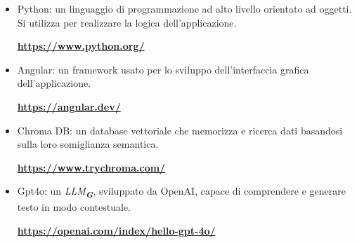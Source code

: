 \begin{itemize}
    \item Python: un linguaggio di programmazione ad alto livello orientato ad oggetti. Si
    utilizza per realizzare la logica dell’applicazione.
    \begin{center}
        \textbf{\url{https://www.python.org/}}
    \end{center}

    \item Angular: un framework usato per lo sviluppo dell’interfaccia grafica dell’applicazione.
    \begin{center}
        \textbf{\url{https://angular.dev/}}
    \end{center}
    
    \item Chroma DB: un database vettoriale che memorizza e ricerca dati basandosi sulla loro somiglianza semantica.
    \begin{center}
        \textbf{\url{https://www.trychroma.com/}}
    \end{center}

    \item Gpt4o: un \emph{LLM}\textsubscript{\textit{\textbf{G}}}, sviluppato da OpenAI, capace di comprendere e generare testo in modo contestuale.
    \begin{center}
        \textbf{\url{https://openai.com/index/hello-gpt-4o/}}
    \end{center}
\end{itemize}


